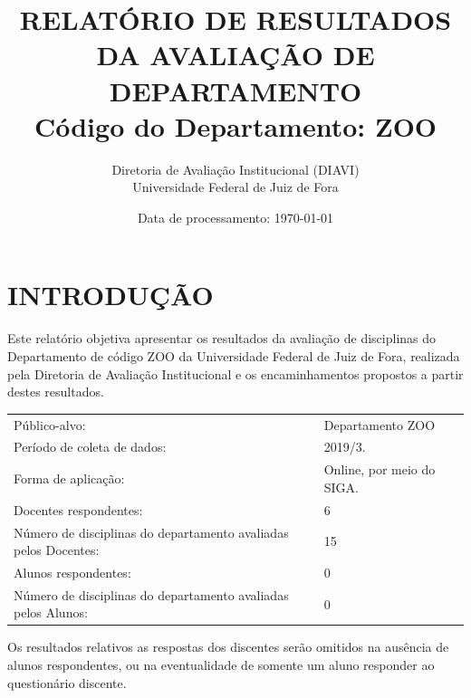 \documentclass[a4paper,10pt]{article}
\date{Data de processamento: \today}
\begin{document}
\author{Diretoria de Avaliação Institucional (DIAVI) \\ Universidade Federal de Juiz de Fora}

\title{RELATÓRIO DE RESULTADOS DA AVALIAÇÃO DE DEPARTAMENTO\\ Código do Departamento: ZOO}
\maketitle
\section{INTRODUÇÃO}
Este relatório objetiva apresentar os resultados da avaliação de disciplinas do Departamento     de código ZOO da Universidade Federal de Juiz de Fora, realizada pela     Diretoria de Avaliação Institucional e os encaminhamentos propostos a     partir destes resultados.

\begin{center}
\begin{tabularx}{\linewidth}{X|l}

Público-alvo:& Departamento  ZOO\\

Período de coleta de dados:& 2019/3.\\

Forma de aplicação:& Online, por meio do SIGA.\\

Docentes respondentes:& 6\\

Número de disciplinas do departamento avaliadas pelos Docentes:& 15\\

Alunos   respondentes:& 0\\

Número de disciplinas do departamento  avaliadas pelos   Alunos:& 0\\
\end{tabularx}
\end{center}

Os resultados relativos as respostas dos discentes serão omitidos na ausência de alunos respondentes, ou na eventualidade de somente um aluno responder ao questionário discente.
\end{document}
